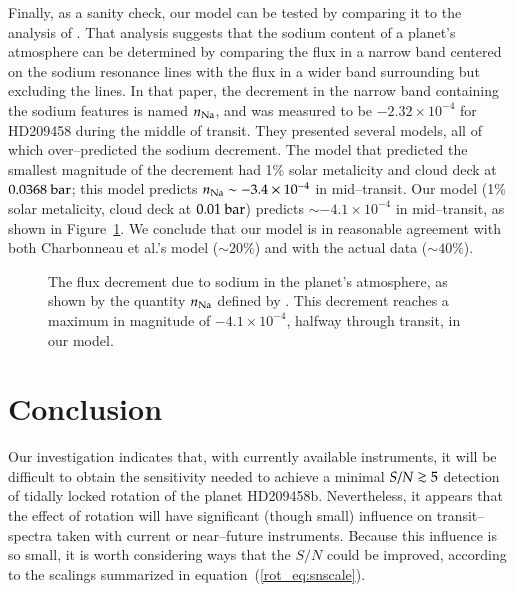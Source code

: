 Finally, as a sanity check, our model can be tested by comparing it to
the analysis of \citet{charbonneau_et_al2002}.  That analysis suggests
that the sodium content of a planet's atmosphere can be determined by
comparing the flux in a narrow band centered on the sodium resonance
lines with the flux in a wider band surrounding but excluding the
lines.  In that paper, the decrement in the narrow band containing the
sodium features is named $n_{\rm Na}$, and was measured to be
$-2.32\times 10^{-4}$ for HD209458 during the middle of transit.  They
presented several models, all of which over--predicted the sodium
decrement.  The model that predicted the smallest magnitude of the
decrement had 1\% solar metalicity and cloud deck at $0.0368 {\rm
~bar}$; this model predicts $n_{\rm Na} \sim -3.4 \times 10^{-4}$ in
mid--transit.  Our model (1\% solar metalicity, cloud deck at $0.01
{\rm ~bar}$) predicts $\sim -4.1 \times 10^{-4}$ in mid--transit, as
shown in Figure~\ref{rot_fig:charbonneau}.  We conclude that our model
is in reasonable agreement with both Charbonneau et al.'s model ($\sim
20\%$) and with the actual data ($\sim 40\%$).
\begin{figure}[p]
\caption[Flux decrement due to neutral Na in planet's atmosphere,
across transit.]{The flux decrement due to sodium in the planet's
atmosphere, as shown by the quantity $n_{\rm Na}$ defined by
\citet{charbonneau_et_al2002}.  This decrement reaches a maximum in
magnitude of $-4.1 \times 10^{-4}$, halfway through transit, in our
model.}
\label{rot_fig:charbonneau}
\end{figure}
\afterpage{\clearpage}



\section{Conclusion}
\label{rot_sec:conc}
Our investigation indicates that, with currently available
instruments, it will be difficult to obtain the sensitivity needed to
achieve a minimal $S/N \gsim 5$ detection of tidally locked rotation
of the planet HD209458b.  Nevertheless, it appears that the effect of
rotation will have significant (though small) influence on
transit--spectra taken with current or near--future instruments.
Because this influence is so small, it is worth considering ways that
the $S/N$ could be improved, according to the scalings summarized in
equation~(\ref{rot_eq:snscale}).

